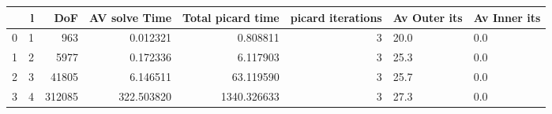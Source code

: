 \begin{tabular}{lrrrrrll}
\toprule
{} &  l &     DoF &  AV solve Time &  Total picard time &  picard iterations & Av Outer its & Av Inner its \\
\midrule
0 &  1 &     963 &       0.012321 &           0.808811 &                  3 &         20.0 &          0.0 \\
1 &  2 &    5977 &       0.172336 &           6.117903 &                  3 &         25.3 &          0.0 \\
2 &  3 &   41805 &       6.146511 &          63.119590 &                  3 &         25.7 &          0.0 \\
3 &  4 &  312085 &     322.503820 &        1340.326633 &                  3 &         27.3 &          0.0 \\
\bottomrule
\end{tabular}
